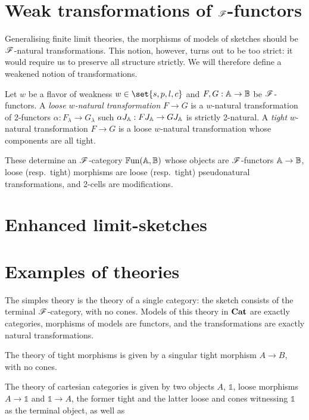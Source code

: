 \documentclass[../thesis.tex]{subfiles}
\begin{document}
  \section{Weak transformations of \texorpdfstring{${\mathscr{F}}$}{F}-functors}
  \newcommand{\bFun}{{\mathbb{F}\mathrm{un}}}
  Generalising finite limit theories, the morphisms of models of sketches should be ${\mathscr{F}}$-natural
  transformations. This notion, however, turns out to be too strict: it would require us to
  preserve all structure strictly. We will therefore define a weakened notion of transformations.
  \begin{definition}
    Let $w$ be a flavor of weakness $w \in \set{s,p,l,c}$ and $F, G : {\mathbb{A}} \to {\mathbb{B}}$ be ${\mathscr{F}}$-functors.
    A \emph{loose $w$-natural transformation} $F \to G$ is a $w$-natural transformation of 2-functors
    $\alpha : F_\lambda \to G_\lambda$ such $\alpha J_{\mathbb{A}} : F J_{\mathbb{A}} \to G J_{\mathbb{A}}$ is strictly
    2-natural. A \emph{tight} $w$-natural transformation $F \to G$ is a loose $w$-natural
    transformation whose components are all tight.

    These determine an ${\mathscr{F}}$-category $\bFun(\bA,\bB)$ whose objects are ${\mathscr{F}}$-functors ${\mathbb{A}} \to
    {\mathbb{B}}$, loose (resp.\ tight) morphisms are loose (resp.\ tight) pseudonatural transformations,
    and 2-cells are modifications. 
  \end{definition}
  \begin{remark}
  \end{remark}

  \section{Enhanced limit-sketches}

  \section{Examples of theories}
  \begin{example}
    The simples theory is the theory of a single category: the sketch consists of the terminal
    ${\mathscr{F}}$-category, with no cones. Models of this theory in ${\mathbf{Cat}}$ are exactly categories,
    morphisms of models are functors, and the transformations are exactly natural transformations.
  \end{example}

  \begin{example}
    The theory of tight morphisms is given by a singular tight morphism $A \to B$, with no cones.
  \end{example}
  
  \newcommand{\bone}{{\mathbb{1}}}
  \begin{example}
    The theory of cartesian categories is given by two objects $A$, $\bone$, loose morphisms $A
    \to \bone$ and $\bone \to A$, the former tight and the latter loose and cones witnessing
    $\bone$ as the terminal object, as well as 
  \end{example}

  \ifSubfilesClassLoaded{\printbibliography}{}
\end{document}
